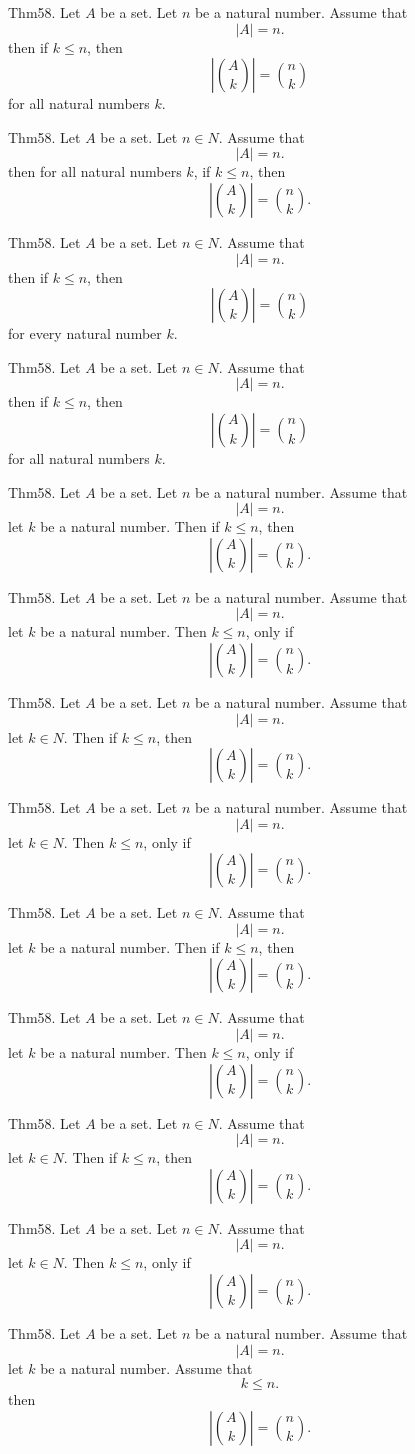 \documentclass{article}
\begin{document}
Thm58. Let $A$ be a set. Let $n$ be a natural number. Assume that $$| A | = n.$$ then if $k \leq n$, then $$| \binom{ A }{ k}| = \binom{ n }{ k}$$ for all natural numbers $k$.

Thm58. Let $A$ be a set. Let $n \in N$. Assume that $$| A | = n.$$ then for all natural numbers $k$, if $k \leq n$, then $$| \binom{ A }{ k}| = \binom{ n }{ k}.$$

Thm58. Let $A$ be a set. Let $n \in N$. Assume that $$| A | = n.$$ then if $k \leq n$, then $$| \binom{ A }{ k}| = \binom{ n }{ k}$$ for every natural number $k$.

Thm58. Let $A$ be a set. Let $n \in N$. Assume that $$| A | = n.$$ then if $k \leq n$, then $$| \binom{ A }{ k}| = \binom{ n }{ k}$$ for all natural numbers $k$.

Thm58. Let $A$ be a set. Let $n$ be a natural number. Assume that $$| A | = n.$$ let $k$ be a natural number. Then if $k \leq n$, then $$| \binom{ A }{ k}| = \binom{ n }{ k}.$$

Thm58. Let $A$ be a set. Let $n$ be a natural number. Assume that $$| A | = n.$$ let $k$ be a natural number. Then $k \leq n$, only if $$| \binom{ A }{ k}| = \binom{ n }{ k}.$$

Thm58. Let $A$ be a set. Let $n$ be a natural number. Assume that $$| A | = n.$$ let $k \in N$. Then if $k \leq n$, then $$| \binom{ A }{ k}| = \binom{ n }{ k}.$$

Thm58. Let $A$ be a set. Let $n$ be a natural number. Assume that $$| A | = n.$$ let $k \in N$. Then $k \leq n$, only if $$| \binom{ A }{ k}| = \binom{ n }{ k}.$$

Thm58. Let $A$ be a set. Let $n \in N$. Assume that $$| A | = n.$$ let $k$ be a natural number. Then if $k \leq n$, then $$| \binom{ A }{ k}| = \binom{ n }{ k}.$$

Thm58. Let $A$ be a set. Let $n \in N$. Assume that $$| A | = n.$$ let $k$ be a natural number. Then $k \leq n$, only if $$| \binom{ A }{ k}| = \binom{ n }{ k}.$$

Thm58. Let $A$ be a set. Let $n \in N$. Assume that $$| A | = n.$$ let $k \in N$. Then if $k \leq n$, then $$| \binom{ A }{ k}| = \binom{ n }{ k}.$$

Thm58. Let $A$ be a set. Let $n \in N$. Assume that $$| A | = n.$$ let $k \in N$. Then $k \leq n$, only if $$| \binom{ A }{ k}| = \binom{ n }{ k}.$$

Thm58. Let $A$ be a set. Let $n$ be a natural number. Assume that $$| A | = n.$$ let $k$ be a natural number. Assume that $$k \leq n.$$ then $$| \binom{ A }{ k}| = \binom{ n }{ k}.$$
\end{document}
